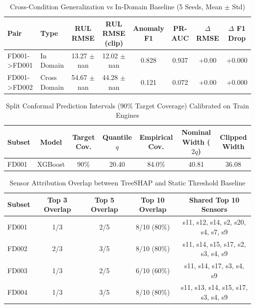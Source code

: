 \begin{table}[htbp]
\centering
\footnotesize
\caption{Cross-Condition Generalization vs In-Domain Baseline (5 Seeds, Mean $\pm$ Std)}
\label{tab:cross_condition_generalization}
\begin{tabular}{llcccccc}
\toprule
\textbf{Pair} & \textbf{Type} & \textbf{RUL RMSE} & \textbf{RUL RMSE (clip)} & \textbf{Anomaly F1} & \textbf{PR-AUC} & \textbf{$\Delta$ RMSE} & \textbf{$\Delta$ F1 Drop} \\
\midrule
FD001->FD001 & In Domain & 13.27 $\pm$ nan & 12.02 $\pm$ nan & 0.828 & 0.937 & +0.00 & +0.000 \\
FD001->FD002 & Cross Domain & 54.67 $\pm$ nan & 44.28 $\pm$ nan & 0.121 & 0.072 & +0.00 & +0.000 \\
\bottomrule
\end{tabular}
\end{table}


\begin{table}[htbp]
\centering
\small
\caption{Split Conformal Prediction Intervals (90\% Target Coverage) Calibrated on Train Engines}
\label{tab:conformal_prediction}
\begin{tabular}{lcccccc}
\toprule
\textbf{Subset} & \textbf{Model} & \textbf{Target Cov.} & \textbf{Quantile $q$} & \textbf{Empirical Cov.} & \textbf{Nominal Width ($2q$)} & \textbf{Clipped Width} \\
\midrule
FD001 & XGBoost & 90\% & 20.40 & 84.0\% & 40.81 & 36.08 \\
\bottomrule
\end{tabular}
\end{table}


\begin{table}[htbp]
\centering
\small
\caption{Sensor Attribution Overlap between TreeSHAP and Static Threshold Baseline}
\label{tab:shap_sensor_overlap}
\begin{tabular}{lcccc}
\toprule
\textbf{Subset} & \textbf{Top 3 Overlap} & \textbf{Top 5 Overlap} & \textbf{Top 10 Overlap} & \textbf{Shared Top 10 Sensors} \\
\midrule
FD001 & 1/3 & 2/5 & 8/10 (80\%) & s11, s12, s14, s2, s20, s4, s7, s9 \\
FD002 & 2/3 & 3/5 & 8/10 (80\%) & s11, s14, s15, s17, s2, s3, s4, s9 \\
FD003 & 1/3 & 2/5 & 6/10 (60\%) & s11, s14, s17, s3, s4, s9 \\
FD004 & 1/3 & 3/5 & 8/10 (80\%) & s11, s13, s14, s15, s17, s3, s4, s9 \\
\bottomrule
\end{tabular}
\end{table}


